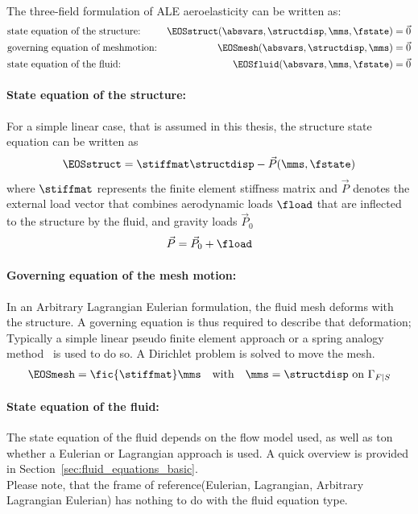 \documentclass[../main.tex]{subfiles}
\begin{document}
 \\
The three-field formulation of \ac{ALE} aeroelasticity can be written as:
\begin{align}
&\text{state equation of the structure:}  &\EOSstruct (\absvars,\structdisp,\mms,\fstate) = \vec{0} \label{eq:3field_structure}\\
&\text{governing equation of meshmotion:} &\EOSmesh   (\absvars,\structdisp,\mms)         = \vec{0} \label{eq:3field_mesh}\\
&\text{state equation of the fluid:}      &\EOSfluid  (\absvars,\mms,\fstate)             = \vec{0}
\label{eq:3field_fluid}\\
\end{align}

\paragraph{State equation of the structure:}
For a simple linear case, that is assumed in this thesis, the structure state equation can be written as
\begin{align}\label{eq:eos_struct}
\EOSstruct = \stiffmat \structdisp - \vec{P}(\mms,\fstate)
\end{align}
where $\stiffmat$ represents the finite element stiffness matrix and $\vec{P}$ denotes the external load vector that combines aerodynamic loads $\fload$ that are inflected to the structure by the fluid, and gravity loads $\vec{P}_0$
\begin{align}
\vec{P}=\vec{P}_0 + \fload
\end{align}

\paragraph{Governing equation of the mesh motion:}
In an Arbitrary Lagrangian Eulerian formulation, the fluid mesh deforms with the structure. A governing equation is thus required to describe that deformation; Typically a simple linear pseudo finite element approach or a spring analogy method~\cite{Farhat1998} is used to do so. A Dirichlet problem is solved to move the mesh.
\begin{align}\label{eq:eos_mesh}
\EOSmesh = \fic{\stiffmat} \mms~~~\text{with}~~~\mms=\structdisp~\text{on}~\Gamma_{F|S}
\end{align}

\paragraph{State equation of the fluid:}
The state equation of the fluid depends on the flow model used, as well as ton whether a Eulerian or Lagrangian approach is used. A quick overview is provided in Section~\ref{sec:fluid_equations_basic}.\\
Please note, that the frame of reference(Eulerian, Lagrangian, Arbitrary Lagrangian Eulerian) has nothing to do with the fluid equation type.
\end{document}
